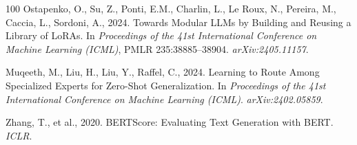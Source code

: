 \documentclass[a4paper,fleql,doubleblind]{cas-sc}
\begin{document}
\begin{thebibliography}{100}
Ostapenko, O., Su, Z., Ponti, E.M., Charlin, L., Le Roux, N., Pereira, M., Caccia, L., Sordoni, A., 2024.
\newblock Towards Modular LLMs by Building and Reusing a Library of LoRAs.
\newblock In \textit{Proceedings of the 41st International Conference on Machine Learning (ICML)}, PMLR 235:38885--38904.
\newblock \textit{arXiv:2405.11157}.

Muqeeth, M., Liu, H., Liu, Y., Raffel, C., 2024.
\newblock Learning to Route Among Specialized Experts for Zero-Shot Generalization.
\newblock In \textit{Proceedings of the 41st International Conference on Machine Learning (ICML)}.
\newblock \textit{arXiv:2402.05859}.

Zhang, T., et al., 2020. BERTScore: Evaluating Text Generation with BERT. \textit{ICLR}.

\end{thebibliography}
\end{document}

